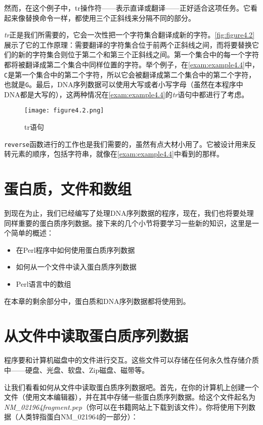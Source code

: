 然而，在这个例子中，tr操作符——表示直译或翻译——正好适合这项任务。它看起来像替换命令一样，都使用三个正斜线来分隔不同的部分。

\textit{tr}正是我们所需要的，它会一次性把一个字符集合翻译成新的字符。\autoref{fig:figure4.2}展示了它的工作原理：需要翻译的字符集合位于前两个正斜线之间，而将要替换它们的新的字符集合则位于第二个和第三个正斜线之间。第一个集合中的每一个字符都将被翻译成第二个集合中同样位置的字符。举个例子，在\autoref{exam:example4.4}中，\verb|C|是第一个集合中的第二个字符，所以它会被翻译成第二个集合中的第二个字符，也就是\verb|G|。最后，DNA序列数据可以使用大写或者小写字母（虽然在本程序中DNA都是大写的），这两种情况在\autoref{exam:example4.4}的\textit{tr}语句中都进行了考虑。

\begin{figure}
  \centering
  \texttt{[image: figure4.2.png]}
  \caption{tr语句}
  \label{fig:figure4.2}
\end{figure}

\verb|reverse|函数进行的工作也是我们需要的，虽然有点大材小用了。它被设计用来反转元素的顺序，包括字符串，就像在\autoref{exam:example4.4}中看到的那样。

\section{蛋白质，文件和数组}
到现在为止，我们已经编写了处理DNA序列数据的程序，现在，我们也将要处理同样重要的蛋白质序列数据。接下来的几个小节将要学习一些新的知识，这里是一个简单的概述：

\begin{itemize}
  \item 在Perl程序中如何使用蛋白质序列数据
  \item 如何从一个文件中读入蛋白质序列数据
  \item Perl语言中的数组
\end{itemize}

在本章的剩余部分中，蛋白质和DNA序列数据都将使用到。

\section{从文件中读取蛋白质序列数据}
程序要和计算机磁盘中的文件进行交互。这些文件可以存储在任何永久性存储介质中——硬盘、光盘、软盘、Zip磁盘、磁带等。

让我们看看如何从文件中读取蛋白质序列数据吧。首先，在你的计算机上创建一个文件（使用文本编辑器），并在其中存储一些蛋白质序列数据。给这个文件起名为\textit{NM\_021964fragment.pep}（你可以在书籍网站上下载到该文件）。你将使用下列数据（人类锌指蛋白NM\_021964的一部分）：

